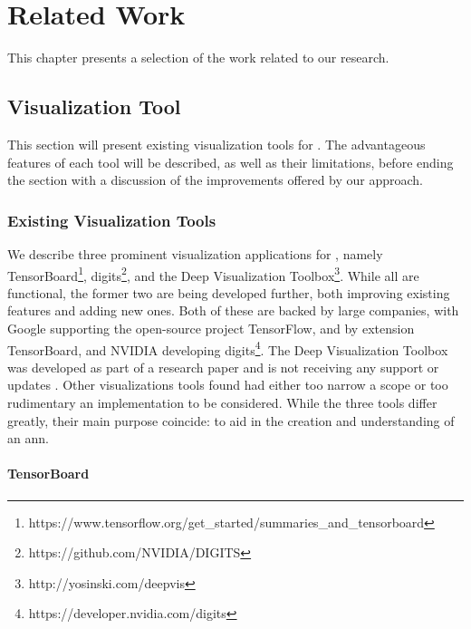 
\chapter{Related Work}

This chapter presents a selection of the work related to our research.

\section{Visualization Tool}

This section will present existing visualization tools for . The advantageous features of each tool will be described, as well as their limitations, before ending the section with a discussion of the improvements offered by our approach. 

\subsection{Existing Visualization Tools}

We describe three prominent visualization applications for , namely TensorBoard\footnote{https://www.tensorflow.org/get\_started/summaries\_and\_tensorboard}, \acrfull{digits}\footnote{https://github.com/NVIDIA/DIGITS}, and the Deep Visualization Toolbox\footnote{http://yosinski.com/deepvis}. While all are functional, the former two are being developed further, both improving existing features and adding new ones. Both of these are backed by large companies, with Google supporting the open-source project TensorFlow, and by extension TensorBoard, and NVIDIA developing \acrshort{digits}\footnote{https://developer.nvidia.com/digits}. The Deep Visualization Toolbox was developed as part of a research paper and is not receiving any support or updates \cite{yosinski-deepvis}. Other visualizations tools found had either too narrow a scope or too rudimentary an implementation to be considered. While the three tools differ greatly, their main purpose coincide: to aid in the creation and understanding of an \acrshort{ann}.

\subsubsection{TensorBoard}

